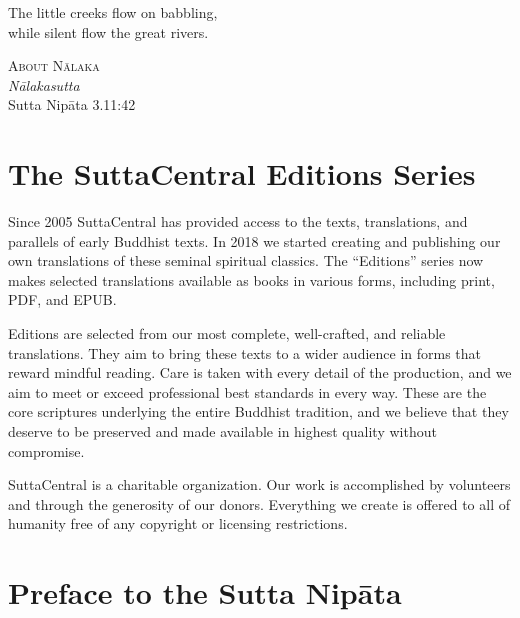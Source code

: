 \documentclass[12pt,openany]{book}%
\newcommand{\blankpage}{
\newpage
\thispagestyle{empty}
\mbox{}
\newpage
}
\newcommand*{\epigraphTranslatedTitle}[1]{\vspace*{.5em}\footnotesize\textsc{#1}\\}%
\newcommand*{\epigraphRootTitle}[1]{\footnotesize\textit{#1}\\}%
\newcommand*{\epigraphReference}[1]{\footnotesize{#1}}%
\begin{document}
\newpage

\setlength{\parindent}{1.5em}%
\newpage

\vspace*{\fill}

\begin{center}
\epigraph{The little creeks flow on babbling,\\
while silent flow the great rivers.}
{
\epigraphTranslatedTitle{About \textsanskrit{Nālaka}}
\epigraphRootTitle{\textsanskrit{Nālakasutta}}
\epigraphReference{Sutta \textsanskrit{Nipāta} 3.11:42}
}
\end{center}

\vspace*{2in}

\vspace*{\fill}

\blankpage%

\setlength{\parindent}{1em}
%
\tableofcontents
\newpage
\pagestyle{fancy}
%
\chapter*{The SuttaCentral Editions Series}

Since 2005 SuttaCentral has provided access to the texts, translations, and parallels of early Buddhist texts. In 2018 we started creating and publishing our own translations of these seminal spiritual classics. The “Editions” series now makes selected translations available as books in various forms, including print, PDF, and EPUB.

Editions are selected from our most complete, well-crafted, and reliable translations. They aim to bring these texts to a wider audience in forms that reward mindful reading. Care is taken with every detail of the production, and we aim to meet or exceed professional best standards in every way. These are the core scriptures underlying the entire Buddhist tradition, and we believe that they deserve to be preserved and made available in highest quality without compromise.

SuttaCentral is a charitable organization. Our work is accomplished by volunteers and through the generosity of our donors. Everything we create is offered to all of humanity free of any copyright or licensing restrictions. 

%
\chapter*{Preface to the Sutta \textsanskrit{Nipāta}}
\end{document}
